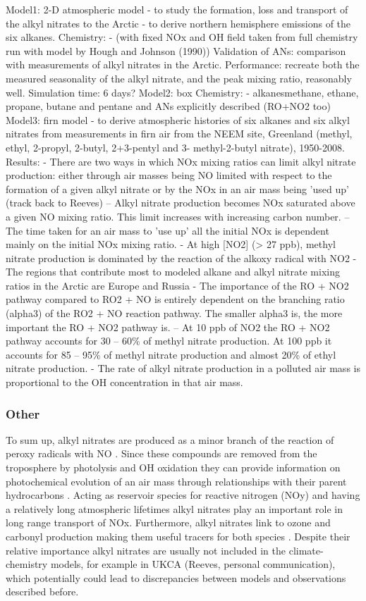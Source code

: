 \documentclass[11pt,a4paper]{article}
\begin{document}
\citep{Newland2013}
Model1: 2-D atmospheric model
- to study the formation, loss and transport of the alkyl nitrates to the Arctic
- to derive northern hemisphere emissions of the six alkanes.
Chemistry:
- (with fixed NOx and OH field taken from full chemistry run with model by Hough and Johnson (1990))
Validation of ANs: comparison with measurements of alkyl nitrates in the Arctic.
Performance: recreate both the measured seasonality of the alkyl nitrate, and the peak mixing ratio, reasonably well.
Simulation time: 6 days?
Model2: box
Chemistry:
- alkanesmethane, ethane, propane, butane and pentane and ANs explicitly described (RO+NO2 too)
Model3: firn model
- to derive atmospheric histories of six alkanes and six alkyl nitrates from measurements in firn air from the NEEM site, Greenland (methyl, ethyl, 2-propyl, 2-butyl, 2+3-pentyl and 3- methyl-2-butyl nitrate), 1950-2008.
Results:
- There are two ways in which NOx mixing ratios can limit alkyl nitrate production: either through air masses being NO limited with respect to the formation of a given alkyl nitrate or by the NOx in an air mass being 'used up' (track back to Reeves)
-- Alkyl nitrate production becomes NOx saturated above a given NO mixing ratio. This limit increases with increasing carbon number.
-- The time taken for an air mass to 'use up' all the initial NOx is dependent mainly on the initial NOx mixing ratio.
- At high [NO2] (> 27 ppb), methyl nitrate production is dominated by the reaction of the alkoxy radical with NO2
- The regions that contribute most to modeled alkane and alkyl nitrate mixing ratios in the Arctic are Europe and Russia
- The importance of the RO + NO2 pathway compared to RO2 + NO is entirely dependent on the branching ratio (alpha3) of the RO2 + NO reaction pathway. The smaller alpha3 is, the more important the RO + NO2 pathway is.
-- At 10 ppb of NO2 the RO + NO2 pathway accounts for 30 – 60\% of methyl nitrate production. At 100 ppb it accounts for 85 – 95\% of methyl nitrate production and almost 20\% of ethyl nitrate production.
- The rate of alkyl nitrate production in a polluted air mass is proportional to the OH concentration in that air mass.

\subsubsection*{Other}

To sum up, alkyl nitrates are produced as a minor branch of the reaction of peroxy radicals with NO \citep{Day2003}. Since these compounds are removed from the troposphere by photolysis and OH oxidation they can provide information on photochemical evolution of an air mass through relationships with their parent hydrocarbons \citep{Bertman1995}. Acting as reservoir species for reactive nitrogen (NOy) and having a relatively long atmospheric lifetimes alkyl nitrates play an important role in long range transport of NOx. Furthermore, alkyl nitrates link to ozone and carbonyl production making them useful tracers for both species \citep{Worton2010}. Despite their relative importance alkyl nitrates are usually not included in the climate-chemistry models, for example in UKCA (Reeves, personal communication), which potentially could lead to discrepancies between models and observations described before. 
\end{document}

